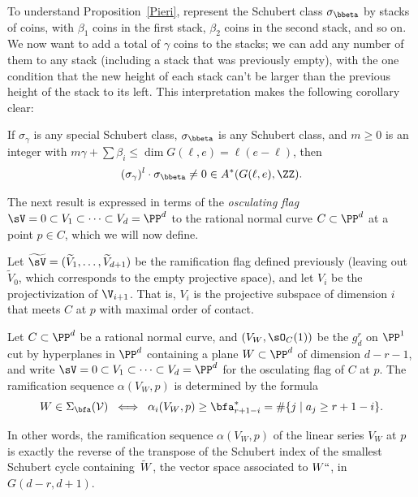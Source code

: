 To understand Proposition~\ref{Pieri}, represent the Schubert class
$\sigma_{\bbeta}$ by 
stacks of coins,
%
with $\beta_1$ coins in the first
stack, $\beta_2$ coins in the second stack, and so on. We now want to
add a total of $\gamma$ coins to the stacks; we can add any number of
them to any stack (including a stack that was previously empty), with
the one condition that the new height of each stack can't be larger than
the previous height of the stack to its left. This interpretation makes
the following corollary clear:

\begin{corollary}\label{intersection with sigma nonzero}
If $\sigma_\gamma$ is any special Schubert class, $\sigma_{\bbeta}$
is any Schubert class,
and $m\geq 0$ is an integer with $m \gamma + \sum \beta_i \leq \dim
G(\ell, e) = \ell(e-\ell)$, then
$$
(\sigma_\gamma)^l \cdot \sigma_{\bbeta} \neq 0 \in A^*(G(\ell, e), \ZZ).
$$
\end{corollary}

The next result is expressed in terms of the \emph{osculating flag}
%
$\sV = 0\subset
V_1\subset \cdots \subset V_d = \PP^d$
to the rational normal curve $C\subset \PP^{d}$ at a point $p\in C$, which
we will now define. 

\def\tL{\,\widetilde{\!W\!}\,} %
\def\tsV{{\widetilde \sV}}
\def\tV{{\widetilde V}}

Let $\tsV = (\tV_1, \dots, \tV_{d+1})$ be the 
 ramification flag defined previously (leaving
out $\tV_{0}$, which corresponds to the empty projective space), 
and let $V_{i}$ be the projectivization of $\V_{i+1}$. That is,
$V_{i}$ is the projective subspace of dimension $i$ that meets $C$ at $p$
with maximal order of contact.

\begin{proposition}\label{ramification}
Let $C \subset \PP^d$ be a rational normal curve, and $(V_W, \sO_C(1))$
be the $g^r_d$ on $\PP^1$ cut by hyperplanes in $\PP^d$ containing a
plane $W \subset \PP^d$ of dimension $d-r-1$, and write $\sV = 0\subset
V_1\subset \cdots \subset V_d = \PP^d$ for the 
osculating flag
of $C$
at $p$. The ramification sequence $\alpha(V_W, p)$
%
is determined by the formula
%
$$
W \in \Sigma_{\bfa}({\cal V}) \; \iff \; \alpha_i(V_W, p) \geq
\bfa^*_{r+1-i} = \#\{j\mid a_j\geq r+1-i\}.
$$
\end{proposition}

In other words, the ramification sequence $\alpha(V_W, p)$ of the linear
series $V_W$ at $p$ is exactly the reverse of the transpose of the
Schubert index of the smallest Schubert cycle containing $\tL$, the vector
space associated to $W` `$, in  $G(d-r, d+1)$.

